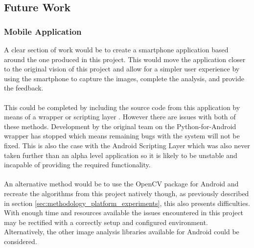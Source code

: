 	\subsection{Future Work}\label{sec:conclusion_future_work}
		\subsubsection{Mobile Application}
			A clear section of work would be to create a smartphone application based around the one produced in this project. This would move the application closer to the original vision of this project and allow for a simpler user experience by using the smartphone to capture the images, complete the analysis, and provide the feedback.
			\\\\
			This could be completed by including the source code from this application by means of a wrapper \citep{kivy2015python} or scripting layer \citep{asl}. However there are issues with both of these methods. Development by the original team on the Python-for-Android wrapper has stopped which means remaining bugs with the system will not be fixed. This is also the case with the Android Scripting Layer which was also never taken further than an alpha level application so it is likely to be unstable and incapable of providing the required functionality.
			\\\\
			An alternative method would be to use the OpenCV package for Android and recreate the algorithms from this project natively though, as previously described in section \ref{sec:methodology_platform_experiments}, this also presents difficulties. With enough time and resources available the issues encountered in this project may be rectified with a correctly setup and configured environment. Alternatively, the other image analysis libraries available for Android could be considered.
